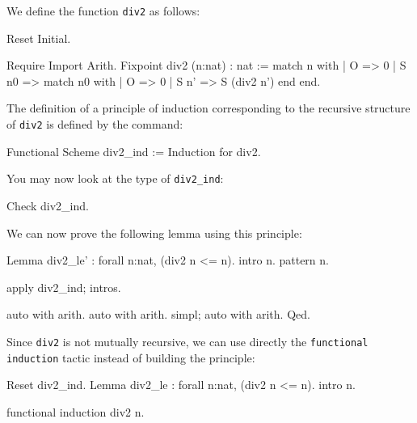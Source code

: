\begin{coq_example*}
\firstexample
{}

We define the function \texttt{div2} as follows:

\begin{coq_eval}
Reset Initial.
\end{coq_eval}

\begin{coq_example*}
Require Import Arith.
Fixpoint div2 (n:nat) : nat :=
  match n with
  | O => 0
  | S n0 => match n0 with
            | O => 0
            | S n' => S (div2 n')
            end
  end.
\end{coq_example*}

The definition of a principle of induction corresponding to the
recursive structure of \texttt{div2} is defined by the command:

\begin{coq_example}
Functional Scheme div2_ind := Induction for div2.
\end{coq_example}

You may now look at the type of {\tt div2\_ind}:

\begin{coq_example}
Check div2_ind.
\end{coq_example}

We can now prove the following lemma using this principle:


\begin{coq_example*}
Lemma div2_le' : forall n:nat, (div2 n <= n).
intro n.
 pattern n.
\end{coq_example*}


\begin{coq_example}
apply div2_ind; intros.
\end{coq_example}

\begin{coq_example*}
auto with arith.
auto with arith.
simpl; auto with arith.
Qed.
\end{coq_example*}

Since \texttt{div2} is not mutually recursive, we can use
directly the \texttt{functional induction} tactic instead of
building the principle:

\begin{coq_example*}
Reset div2_ind.
Lemma div2_le : forall n:nat, (div2 n <= n).
intro n.
\end{coq_example*}

\begin{coq_example}
functional induction div2 n.
\end{coq_example}


\end{coq_example*}
